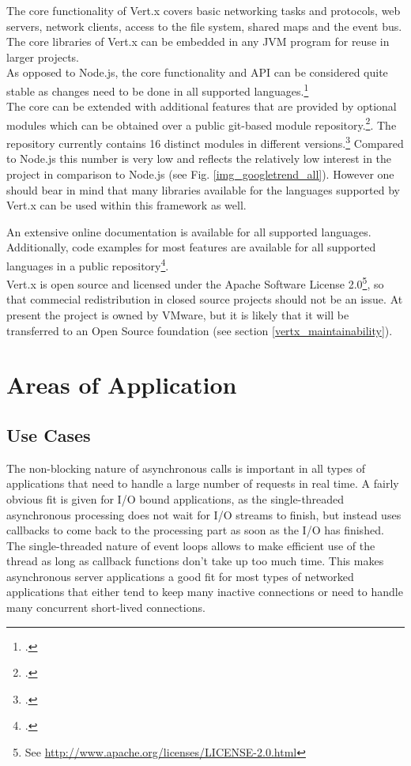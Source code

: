 The core functionality of Vert.x covers basic networking tasks and protocols,
web servers, network clients, access to the file system, shared maps and the event bus.
The core libraries of Vert.x can be embedded in any JVM program for reuse in
larger projects.\\
As opposed to Node.js, the core functionality and API can be considered quite
stable as changes need to be done in all supported languages.\footcite[Cf.][]{vertx_2012}\\ %
The core can be extended with additional features that are provided by optional
modules which can be obtained over a public git-based module
repository.\footcite[Cf.][]{vertx_mod_2012}.
The repository currently contains 16 distinct modules in different
versions.\footcite[Cf.][]{Vertx_repository_2012} Compared to Node.js this
number is very low and reflects the relatively low interest in the project
in comparison to Node.js (see Fig. \ref{img_googletrend_all}).
However one should bear in mind that many libraries available for the languages supported
by Vert.x can be used within this framework as well.

An extensive online documentation is available for all supported languages.
Additionally, code examples for most features are available for all supported languages in
a public repository\footcite[Cf.][]{Fox_2013}.\\
Vert.x is open source and licensed under the Apache Software License
2.0\footnote{See \url{http://www.apache.org/licenses/LICENSE-2.0.html}}, so that
commecial redistribution in closed source projects should not be an issue.
At present the project is owned by VMware, but it is likely that it will be transferred to
an Open Source foundation (see section \ref{vertx_maintainability}).


\newpage
\section{Areas of Application}
\label{areas_of_application}

\subsection{Use Cases}
\label{use_cases}
The non-blocking nature of asynchronous calls is important in all types of
applications that need to handle a large number of requests in real time.
A fairly obvious fit is given for I/O bound applications, as the single-threaded asynchronous processing
does not wait for I/O streams to finish, but instead uses callbacks to come back to the processing part
as soon as the I/O has finished.
The single-threaded nature of event loops allows to make efficient use of the
thread as long as callback functions don't take up too much time. This makes asynchronous
server applications a good fit for most types of networked applications that
either tend to keep many inactive connections or need to handle many concurrent 
short-lived connections.\\

